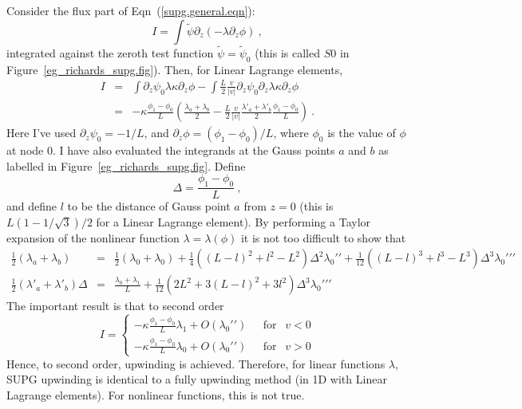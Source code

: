 \documentclass[]{scrreprt}
\begin{document}
Consider the flux part of Eqn~(\ref{supg.general.eqn}):
\begin{equation}
I = \int \tilde{\psi}\partial_{z}(-\lambda\partial_{z}\phi) \ ,
\end{equation}
integrated against the zeroth test function
$\tilde{\psi}=\tilde{\psi}_{0}$ (this is called $S0$ in
Figure~\ref{eg_richards_supg.fig}).  Then, for Linear Lagrange elements,
\begin{eqnarray}
I & = & \int \partial_{z}\psi_{0}\lambda \kappa\partial_{z}\phi - \int
\frac{L}{2}\frac{v}{|v|}\partial_{z}\psi_{0}\partial_{z}\lambda
\kappa\partial_{z} \phi \nonumber \\
& = & -\kappa \frac{\phi_{1}-\phi_{0}}{L} \left(
\frac{\lambda_{a}+\lambda_{b}}{2} - \frac{L}{2}\frac{v}{|v|}
\frac{\lambda'_{a} + \lambda'_{b}}{2} \frac{\phi_{1}-\phi_{0}}{L}
\right) \ .
\label{eqn.i.eg.supg.a.b}
\end{eqnarray}
Here I've used $\partial_{z}\psi_{0} = -1/L$, and $\partial_{z}\phi =
(\phi_{1}-\phi_{0})/L$, where $\phi_{0}$ is the value of $\phi$ at
node 0.  I have also evaluated the integrands at the Gauss points $a$ and $b$
as labelled in Figure~\ref{eg_richards_supg.fig}.  Define
\begin{equation}
\Delta = \frac{\phi_{1}-\phi_{0}}{L} \ ,
\end{equation}
and define $l$ to be the distance of Gauss point $a$ from $z=0$ (this
is $L(1 - 1/\sqrt{3})/2$ for a Linear Lagrange element).
By performing a
Taylor expansion of the nonlinear function $\lambda=\lambda(\phi)$ it
is not too difficult to show that
\begin{eqnarray}
\mbox{$\frac{1}{2}$}(\lambda_{a}+\lambda_{b}) & = &
\mbox{$\frac{1}{2}$}(\lambda_{0}+\lambda_{0}) +
\mbox{$\frac{1}{4}$}\left( (L-l)^{2} + l^{2} - L^{2}
\right)\Delta^{2}\lambda_{0}'{}' + \mbox{$\frac{1}{12}$} \left(
(L-l)^{3} + l^{3} - L^{3} \right) \Delta^{3}\lambda_{0}'{}'{}' \\
\mbox{$\frac{1}{2}$}(\lambda'_{a}+\lambda'_{b})\Delta & = &
\frac{\lambda_{0}+\lambda_{1}}{L} +  \mbox{$\frac{1}{12}$} \left(
2L^{2} + 3(L-l)^{2} + 3l^{2} \right) \Delta^{3}\lambda_{0}'{}'{}'
\end{eqnarray}
The important result is that to second order
\begin{equation}
I = \left\{
\begin{array}{ll}
-\kappa \frac{\phi_{1}-\phi_{0}}{L} \lambda_{1} + O(\lambda_{0}'{}') & \ \ \ \mbox{for }
\ \ v<0 \\
-\kappa \frac{\phi_{1}-\phi_{0}}{L} \lambda_{0} + O(\lambda_{0}'{}')& \ \ \ \mbox{for } \ \ v>0
\end{array}
\right.
\label{eqn.supg.eg.2nd.order}
\end{equation}
Hence, to second order,
upwinding is achieved.  Therefore, for linear functions $\lambda$,
SUPG upwinding is identical to a fully upwinding method (in 1D with
Linear Lagrange elements).  For nonlinear functions, this is not true.
\end{document}
